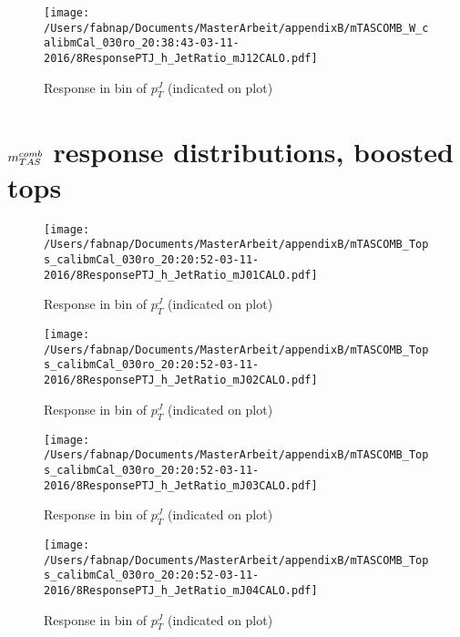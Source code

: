 \begin{figure}

\texttt{[image: /Users/fabnap/Documents/MasterArbeit/appendixB/mTASCOMB\_W\_calibmCal\_030ro\_20:38:43-03-11-2016/8ResponsePTJ\_h\_JetRatio\_mJ12CALO.pdf]}
\caption{Response in bin of  $p_{T}^{J}$ (indicated on plot)} 

\end{figure}

\clearpage
\onecolumn
\vspace*{\fill}
\section{$m^{comb}_{TAS}$ response distributions, boosted tops}
\vfill
\clearpage
\twocolumn
 \clearpage %
\begin{figure}

\texttt{[image: /Users/fabnap/Documents/MasterArbeit/appendixB/mTASCOMB\_Tops\_calibmCal\_030ro\_20:20:52-03-11-2016/8ResponsePTJ\_h\_JetRatio\_mJ01CALO.pdf]}
\caption{Response in bin of  $p_{T}^{J}$ (indicated on plot)} 

\end{figure}

\begin{figure}

\texttt{[image: /Users/fabnap/Documents/MasterArbeit/appendixB/mTASCOMB\_Tops\_calibmCal\_030ro\_20:20:52-03-11-2016/8ResponsePTJ\_h\_JetRatio\_mJ02CALO.pdf]}
\caption{Response in bin of  $p_{T}^{J}$ (indicated on plot)} 

\end{figure}

\begin{figure}

\texttt{[image: /Users/fabnap/Documents/MasterArbeit/appendixB/mTASCOMB\_Tops\_calibmCal\_030ro\_20:20:52-03-11-2016/8ResponsePTJ\_h\_JetRatio\_mJ03CALO.pdf]}
\caption{Response in bin of  $p_{T}^{J}$ (indicated on plot)} 

\end{figure}

\begin{figure}

\texttt{[image: /Users/fabnap/Documents/MasterArbeit/appendixB/mTASCOMB\_Tops\_calibmCal\_030ro\_20:20:52-03-11-2016/8ResponsePTJ\_h\_JetRatio\_mJ04CALO.pdf]}
\caption{Response in bin of  $p_{T}^{J}$ (indicated on plot)} 

\end{figure}

